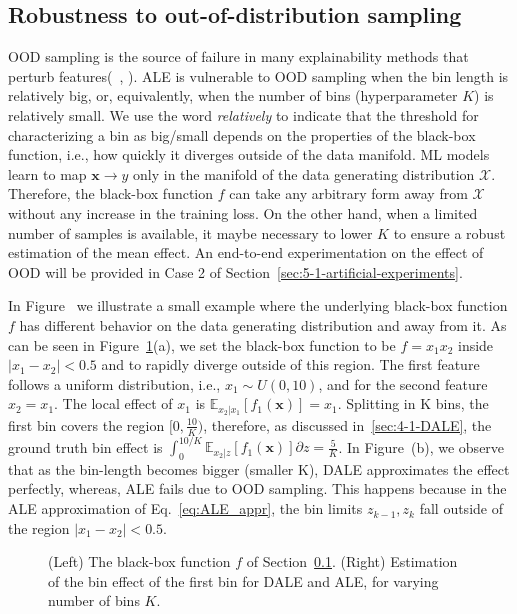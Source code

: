 \documentclass[wcp]{jmlr}
\newcommand{\Xb}{\mathcal{X}}
\newcommand{\xb}{\mathbf{x}}
\newcommand{\E}{\mathbb{E}}
\begin{document}
\subsection{Robustness to out-of-distribution sampling}
\label{sec:4-3-robustness}
OOD sampling is the source of failure in many explainability methods
that perturb features(~\cite{Baniecki2022}, \cite{Hooker2021}). ALE is
vulnerable to OOD sampling when the bin length is relatively big, or,
equivalently, when the number of bins (hyperparameter \(K\)) is
relatively small. We use the word \textit{relatively} to indicate that
the threshold for characterizing a bin as big/small depends on the
properties of the black-box function, i.e., how quickly it diverges
outside of the data manifold. ML models learn to map
\( \xb \rightarrow y \) only in the manifold of the data generating
distribution \(\Xb\). Therefore, the black-box function \(f\) can take
any arbitrary form away from \(\Xb\) without any increase in the
training loss. On the other hand, when a limited number of samples is
available, it maybe necessary to lower \(K\) to ensure a robust
estimation of the mean effect. An end-to-end experimentation on the
effect of OOD will be provided in Case 2 of
Section~\ref{sec:5-1-artificial-experiments}.


In Figure~ we illustrate a small
example where the underlying black-box function \(f\) has different
behavior on the data generating distribution and away from it. As can
be seen in Figure~\ref{fig:example-different-bins}(a), we set the
black-box function to be \(f = x_1x_2\) inside \(|x_1-x_2| < 0.5\) and
to rapidly diverge outside of this region. The first feature follows a
uniform distribution, i.e., \(x_1 \sim U(0,10)\), and for the second
feature \(x_2=x_1\). The local effect of \(x_1\) is
\(\E_{x_2|x_1} \left [ f_1(\xb) \right ] = x_1 \). Splitting in K bins,
the first bin covers the region \( [0, \frac{10}{K} ) \), therefore,
as discussed in~\ref{sec:4-1-DALE}, the ground truth bin effect is
\(\int_0^{10/K} \E_{x_2|z}\left[f_1(\xb)\right]\partial z =
\frac{5}{K}\). In Figure~(b), we
observe that as the bin-length becomes bigger (smaller K), DALE
approximates the effect perfectly, whereas, ALE fails due to OOD
sampling. This happens because in the ALE approximation of
Eq.~\eqref{eq:ALE_appr}, the bin limits \(z_{k-1}, z_k\) fall outside
of the region \(|x_1-x_2| < 0.5\).

\begin{figure}[h]
  \centering
  \resizebox{.35\columnwidth}{!}{}
  \resizebox{.35\columnwidth}{!}{}
  \caption[Example comparison]{(Left) The black-box function \(f\) of
    Section~\ref{sec:4-3-robustness}. (Right) Estimation of the bin
    effect of the first bin for DALE and ALE, for varying number of
    bins \(K\).}
  \label{fig:example-different-bins}
\end{figure}
\end{document}
